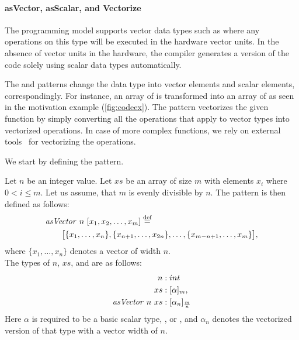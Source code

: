 

\paragraph{{\footnotesize as}Vector, {\footnotesize as}Scalar, and Vectorize}
The \OpenCL programming model supports vector data types such as  where any operations on this type will be executed in the hardware vector units.
In the absence of vector units in the hardware, the \OpenCL compiler generates a version of the code solely using scalar data types automatically.

The \asVector and \asScalar patterns change the data type into vector elements and scalar elements, correspondingly.
For instance, an array of  is transformed into an array of  as seen in the motivation example (\autoref{fig:codeex}).
The \vect pattern vectorizes the given function by simply converting all the operations that apply to vector types into vectorized operations.
In case of more complex functions, we rely on external tools~\cite{KarrenbergHa2011} for vectorizing the operations.

We start by defining the \asVector pattern.
\begin{definition}
  \label{definition:pattern:asVector}
  Let $n$ be an integer value.
  Let $xs$ be an array of size $m$ with elements $x_i$ where $0 < i \leq m$.
  Let us assume, that $m$ is evenly divisible by $n$.
  The \asVector pattern is then defined as follows:
  \begin{align*}
    &\text{\textit{asVector}}\ n\ [x_1, x_2, \dots, x_m] \stackrel{\textrm{\scriptsize def}}{=} \\
    &\qquad\big[\{x_1, \ldots, x_n\}, \{x_{n+1}, \ldots, x_{2n}\}, \ldots, \{x_{m-n+1}, \ldots, x_m\}\big],
  \end{align*}
  where $\{x_1,\ldots,x_n\}$ denotes a vector of width $n$.\\
  The types of $n$, $xs$, and \asVector are as follows:
  \begin{align*}
    n &: int\\
    xs &: [\alpha]_m,\\
    \text{\textit{asVector}}\ n\ xs &: [\alpha_n]_{\frac{m}{n}}
  \end{align*}
  Here $\alpha$ is required to be a basic scalar type, \eg,  or , and $\alpha_n$ denotes the vectorized version of that type with a vector width of $n$.
\end{definition}

